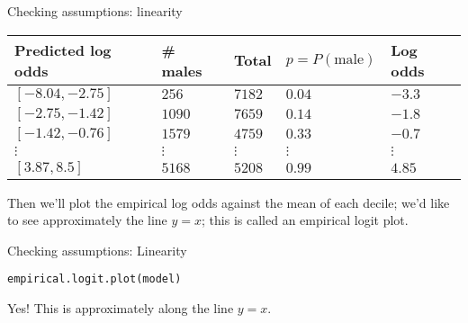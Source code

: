 \documentclass{beamer}\usepackage[]{graphicx}\usepackage[]{color}
\makeatletter
\newcommand{\hlstd}[1]{\textcolor[rgb]{1,0.894,0.769}{#1}}%
\newcommand{\hlkwd}[1]{\textcolor[rgb]{1,0.78,0.769}{#1}}%
\newenvironment{kframe}{%
 \def\at@end@of@kframe{}%
 \ifinner\ifhmode%
  \def\at@end@of@kframe{\end{minipage}}%
  \begin{minipage}{\columnwidth}%
 \fi\fi%
 \def\FrameCommand##1{\hskip\@totalleftmargin \hskip-\fboxsep
 \colorbox{shadecolor}{##1}\hskip-\fboxsep
     \hskip-\linewidth \hskip-\@totalleftmargin \hskip\columnwidth}%
 \MakeFramed {\advance\hsize-\width
   \@totalleftmargin\z@ \linewidth\hsize
   \@setminipage}}%
 {\par\unskip\endMakeFramed%
 \at@end@of@kframe}
\newenvironment{knitrout}{}{} %
\makeatother
\begin{document}
\begin{darkframes}
\begin{frame}{Checking assumptions: linearity}
      \begin{center}
        \begin{tabular}{lllll}
          Predicted log odds & \# males & Total & $p=P(\text{male})$ & Log odds \\
          \hline
          $[ -8.04, -2.75 ]$ & $256$ &  $7182$ & $0.04$ & $-3.3$ \\
          $[ -2.75, -1.42 ]$ & $1090$ &  $7659$ & $0.14$ & $-1.8$ \\
          $[ -1.42, -0.76 ]$ & $1579$ &  $4759$ & $0.33$ & $-0.7$ \\
          $\vdots$ & $\vdots$ & $\vdots$ & $\vdots$ & $\vdots$ \\
          $[ 3.87, 8.5 ]$ & $5168$ &  $5208$ & $0.99$ & $4.85$ \\

        \end{tabular}
      \end{center}

      Then we'll plot the empirical log odds against the mean of each decile; we'd like to see approximately the line $y=x$; this is called an \alert{empirical logit plot}.
    \end{frame}

    \begin{frame}[fragile]{Checking assumptions: Linearity}
\begin{knitrout}
\begin{kframe}
\begin{alltt}
\hlkwd{empirical.logit.plot}\hlstd{(model)}
\end{alltt}
\end{kframe}


\end{knitrout}
      \pause\vspace{-0.5cm}
      \greencheckmark \alert{Yes!} This is approximately along the line $y=x$.
    \end{frame}
  \end{darkframes}
\end{document}
